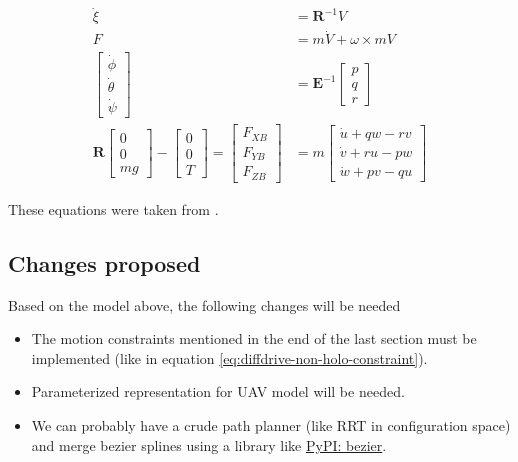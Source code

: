 \begin{align*}
    \dot{\xi} &= \mathbf{R}^{-1} V \\
    F &= m \dot{V} + \omega \times mV \\
    \begin{bmatrix}
        \dot{\phi} \\ \dot{\theta} \\ \dot{\psi}
    \end{bmatrix} &= \mathbf{E}^{-1} \begin{bmatrix}
        p \\ q \\ r
    \end{bmatrix} \\
    \mathbf{R} \begin{bmatrix}
        0 \\ 0 \\ mg
    \end{bmatrix} - \begin{bmatrix}
        0 \\ 0 \\ T
    \end{bmatrix} = \begin{bmatrix}
        F_{XB} \\ F_{YB} \\ F_{ZB}
    \end{bmatrix} &= m \begin{bmatrix}
        \dot{u} + qw - rv \\
        \dot{v} + ru - pw \\
        \dot{w} + pv - qu
    \end{bmatrix}
\end{align*}

These equations were taken from \cite{vilez2015trajectory}.

\subsection{Changes proposed}

Based on the model above, the following changes will be needed

\begin{itemize}
    \item The motion constraints mentioned in the end of the last section must be implemented (like in equation \ref{eq:diffdrive-non-holo-constraint}).
    \item Parameterized representation for UAV model will be needed.
    \item We can probably have a crude path planner (like RRT in configuration space) and merge bezier splines using a library like \href{https://bezier.readthedocs.io/en/stable/index.html}{PyPI: bezier}.
\end{itemize}
